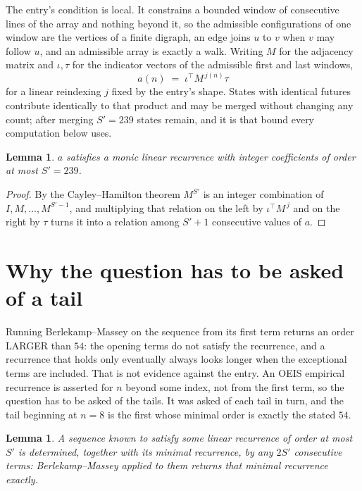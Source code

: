 \documentclass[11pt,a4paper]{article}
\theoremstyle{plain}
\newtheorem{lemma}[theorem]{Lemma}
\theoremstyle{definition}
\begin{document}
The entry's condition is local. It constrains a bounded window of consecutive lines of the
array and nothing beyond it, so the admissible configurations of one window are the vertices of
a finite digraph, an edge joins $u$ to $v$ when $v$ may follow $u$, and an admissible array is
exactly a walk. Writing $M$ for the adjacency matrix and $\iota,\tau$ for the indicator vectors
of the admissible first and last windows,
\[
a(n)\;=\;\iota^{\!\top}M^{\,j(n)}\tau
\]
for a linear reindexing $j$ fixed by the entry's shape. States with identical futures
contribute identically to that product and may be merged without changing any count; after
merging $S'=239$ states remain, and it is that bound every computation below uses.

\begin{lemma}\label{lem:cf}
$a$ satisfies a monic linear recurrence with integer coefficients of order at most $S'=239$.
\end{lemma}

\begin{proof}
By the Cayley--Hamilton theorem $M^{S'}$ is an integer combination of $I,M,\dots,M^{S'-1}$,
and multiplying that relation on the left by $\iota^{\!\top}M^{\,j}$ and on the right by
$\tau$ turns it into a relation among $S'+1$ consecutive values of $a$.
\end{proof}

\section{Why the question has to be asked of a tail}

Running Berlekamp--Massey on the sequence from its first term returns an order LARGER than $54$: the opening terms do not satisfy the recurrence, and a recurrence that holds only eventually always looks longer when the exceptional terms are included. That is not evidence against the entry. An OEIS empirical recurrence is asserted for $n$ beyond some index, not from the first term, so the question has to be asked of the tails. It was asked of each tail in turn, and the tail beginning at $n=8$ is the first whose minimal order is exactly the stated $54$.

\begin{lemma}\label{lem:bm}
A sequence known to satisfy some linear recurrence of order at most $S'$ is determined,
together with its minimal recurrence, by any $2S'$ consecutive terms: Berlekamp--Massey applied
to them returns that minimal recurrence exactly.
\end{lemma}
\end{document}

